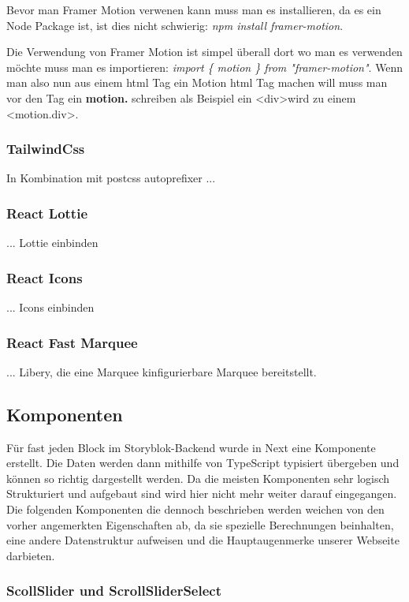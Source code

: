 Bevor man Framer Motion verwenen kann muss man es installieren, da es ein Node Package ist, ist dies nicht schwierig: \emph{npm install framer-motion}.

Die Verwendung von Framer Motion ist simpel überall dort wo man es verwenden möchte muss man es importieren: \emph{import \{ motion \} from "framer-motion"}.
Wenn man also nun aus einem html Tag ein Motion html Tag machen will muss man vor den Tag ein \textbf{motion.} schreiben als Beispiel ein \textless div\textgreater wird zu einem \textless motion.div\textgreater.   



\subsubsection*{TailwindCss}
In Kombination mit postcss autoprefixer ...

\subsubsection*{React Lottie}
... Lottie einbinden

\subsubsection*{React Icons}
... Icons einbinden

\subsubsection*{React Fast Marquee}
... Libery, die eine Marquee kinfigurierbare Marquee bereitstellt.

\subsection{Komponenten}

Für fast jeden Block im Storyblok-Backend wurde in Next eine Komponente erstellt. Die Daten werden dann mithilfe von TypeScript typisiert übergeben und können so richtig dargestellt werden. Da die meisten Komponenten sehr logisch Strukturiert und aufgebaut sind wird hier nicht mehr weiter darauf eingegangen. Die folgenden Komponenten die dennoch beschrieben werden weichen von den vorher angemerkten Eigenschaften ab, da sie spezielle Berechnungen beinhalten, eine andere Datenstruktur aufweisen und die Hauptaugenmerke unserer Webseite darbieten.

\subsubsection*{ScollSlider und ScrollSliderSelect}

